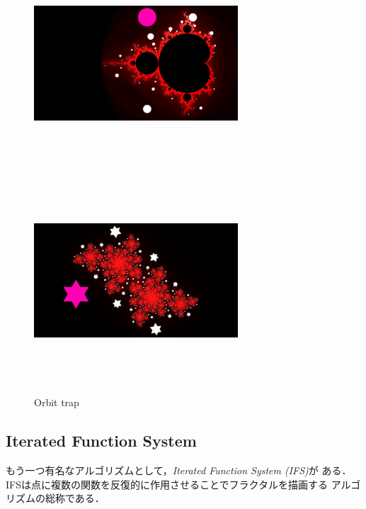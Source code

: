 \begin{figure}[htbp]
 \begin{minipage}{0.49\hsize}
  \center
  \includegraphics[width=3in, height=3in, keepaspectratio]{../img/fractal/mandelbrot-orbit.pdf}
  \label{}
 \end{minipage}
 \begin{minipage}{0.49\hsize}
  \center
  \includegraphics[width=3in, height=3in,
   keepaspectratio]{../img/fractal/juliaOrbit.pdf}
  \label{}
 \end{minipage}
 \caption{Orbit trap}
 \label{fig:orbitTrap}
\end{figure}

\subsection{Iterated Function System}

もう一つ有名なアルゴリズムとして，\textit{Iterated Function System (IFS)}が
ある．IFSは点に複数の関数を反復的に作用させることでフラクタルを描画する
アルゴリズムの総称である．

